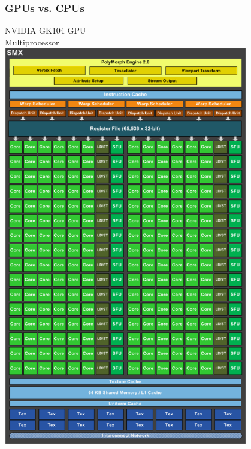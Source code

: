 \documentclass{beamer}
\begin{document}
\begin{frame}[t]
  \frametitle{GPUs vs. CPUs}
  \vspace{0.5cm}
   \begin{minipage}[t]{0.40\linewidth}
    NVIDIA GK104 GPU\\
    Multiprocessor\vspace{0.15cm}\\
    \includegraphics[width=0.8\textwidth]{graphics/nvidia_kepler_gk104_sm.pdf}
  \end{minipage}
  \begin{minipage}[t]{0.55\linewidth}

\end{minipage}
\end{frame}
\end{document}
